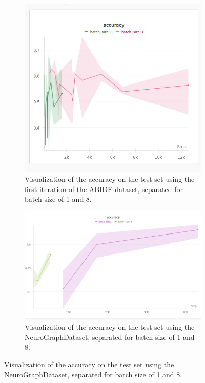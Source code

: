 	
	\begin{figure}[!h]
		\centering
		\begin{subfigure}[b]{0.45\textwidth}
			\centering
			\includegraphics[width=\textwidth]{figures/3site_runs.jpg}
			\caption{Visualization of the accuracy on the test set using the first iteration of the ABIDE dataset, separated for batch size of 1 and 8.}
			\label{fig:3site_runs}
		\end{subfigure}
		\hfill
		\begin{subfigure}[b]{0.50\textwidth}
			\centering
			\includegraphics[width=\textwidth]{figures/ng_accuracy.png}
			\caption{Visualization of the accuracy on the test set using the NeuroGraphDataset, separated for batch size of 1 and 8.}
			\label{fig:neurograph}
		\end{subfigure}
	\end{figure}
	
